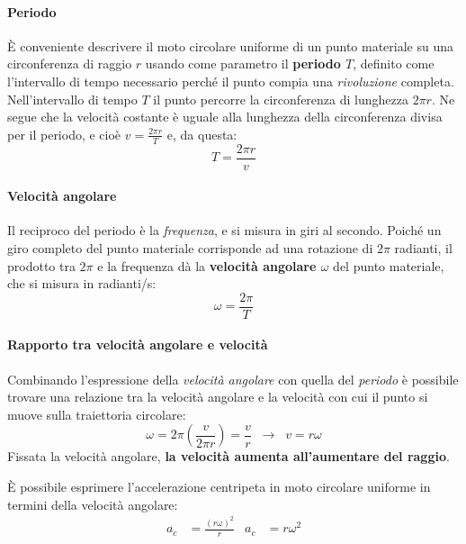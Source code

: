 \documentclass[a4paper,11pt,oneside]{book}
\begin{document}
\paragraph{Periodo}
È conveniente descrivere il moto circolare uniforme di un punto materiale su una circonferenza di raggio $r$ usando come parametro il \textbf{periodo $T$}, 
definito come l’intervallo di tempo necessario perché il punto compia una \emph{rivoluzione} completa. Nell’intervallo di tempo $T$ il punto percorre la circonferenza 
di lunghezza $2\pi r$. Ne segue che la velocità costante è uguale alla lunghezza della circonferenza divisa per il periodo, e cioè $v = \tfrac{2\pi r}{T}$ e, da questa:
\begin{equation*}
    T = \frac{2\pi r}{v}
\end{equation*}

\paragraph{Velocità angolare}
Il reciproco del periodo è la \emph{frequenza}, e si misura in giri al secondo. Poiché un giro completo del punto materiale corrisponde ad una rotazione di $2\pi$ radianti,
il prodotto tra $2\pi$ e la frequenza dà la \textbf{velocità angolare $\omega$} del punto materiale, che si misura in radianti/s:
\begin{equation*}
    \omega = \frac{2\pi}{T}
\end{equation*}

\paragraph{Rapporto tra velocità angolare e velocità}
Combinando l'espressione della \emph{velocità angolare} con quella del \emph{periodo} è possibile trovare una relazione tra la velocità angolare e la velocità con cui il 
punto si muove sulla traiettoria circolare:
\begin{equation*}
    \omega = 2\pi \left (\frac{v}{2\pi r} \right)  = \frac{v}{r} \;\; \rightarrow \;\; v = r\omega
\end{equation*}
Fissata la velocità angolare, \textbf{la velocità aumenta all'aumentare del raggio}.

È possibile esprimere l'accelerazione centripeta in moto circolare uniforme in termini della velocità angolare:
\begin{align*}
    a_c &= \frac{(r\omega)^2}{r} & a_c &= r\omega^2
\end{align*}
\end{document}
